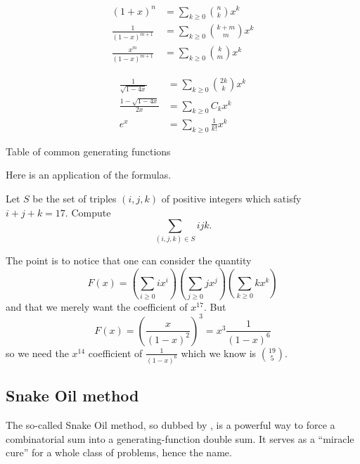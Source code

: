\documentclass[11pt]{scrartcl}
\begin{document}
\begin{table}[ht]
  \centering
  \begin{minipage}{0.4\textwidth}
  \begin{mdframed}
  \begin{align*}
    (1+x)^n &= \sum_{k \ge 0} \binom{n}{k} x^k \\
    \frac{1}{(1-x)^{m+1}}
      &= \sum_{k \ge 0} \binom{k+m}{m} x^k \\
    \frac{x^m}{(1-x)^{m+1}}
      &= \sum_{k \ge 0} \binom{k}{m} x^k
  \end{align*}
  \end{mdframed}
  \end{minipage}
  \qquad
  \begin{minipage}{0.4\textwidth}
  \begin{mdframed}
  \begin{align*}
    \frac{1}{\sqrt{1-4x}} &= \sum_{k \ge 0} \binom{2k}{k} x^k \\
    \frac{1-\sqrt{1-4x}}{2x} &= \sum_{k \ge 0} C_k x^k \\
    e^x &= \sum_{k \ge 0} \frac{1}{k!} x^k
  \end{align*}
  \end{mdframed}
  \end{minipage}
  \caption{Table of common generating functions}
  \label{tab:genfunc}
\end{table}

Here is an application of the formulas.
\begin{example}
  Let $S$ be the set of triples $(i,j,k)$ of positive integers
  which satisfy $i+j+k=17$. Compute
  \[ \sum_{(i,j,k) \in S} ijk. \]
\end{example}
\begin{soln}
  The point is to notice that one can consider the quantity
  \[
    F(x)
    =
    \left( \sum_{i \ge 0} i x^i \right)
    \left( \sum_{j \ge 0} j x^j \right)
    \left( \sum_{k \ge 0} k x^k \right)
  \]
  and that we merely want the coefficient of $x^{17}$.
  But
  \[
    F(x) = \left( \frac{x}{(1-x)^2} \right)^3
    = x^3 \frac{1}{(1-x)^6}
  \]
  so we need the $x^{14}$ coefficient of $\frac{1}{(1-x)^6}$
  which we know is $\binom{19}{5}$.
\end{soln}

\subsection{Snake Oil method}
The so-called Snake Oil method, so dubbed by \cite{ref:gfo},
is a powerful way to force a combinatorial sum into a
generating-function double sum.
It serves as a ``miracle cure'' for a whole class of problems, hence the name.
\end{document}
